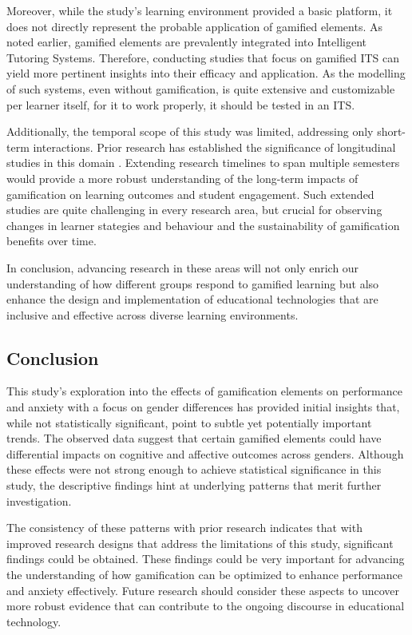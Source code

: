 Moreover, while the study's learning environment provided a basic platform, it does not directly represent the probable application of gamified elements. As noted earlier, gamified elements are prevalently integrated into Intelligent Tutoring Systems. Therefore, conducting studies that focus on gamified ITS can yield more pertinent insights into their efficacy and application.
As the modelling of such systems, even without gamification, is quite extensive and customizable per learner itself, for it to work properly, it should be tested in an ITS.

Additionally, the temporal scope of this study was limited, addressing only short-term interactions. Prior research has established the significance of longitudinal studies in this domain \parencite{oliveiraTailoredGamificationEducation2023,dehghanzadehUsingGamificationSupport2024}. Extending research timelines to span multiple semesters would provide a more robust understanding of the long-term impacts of gamification on learning outcomes and student engagement. Such extended studies are quite challenging in every research area, but crucial for observing changes in learner stategies and behaviour and the sustainability of gamification benefits over time.

In conclusion, advancing research in these areas will not only enrich our understanding of how different groups respond to gamified learning but also enhance the design and implementation of educational technologies that are inclusive and effective across diverse learning environments.

\subsection*{Conclusion}
This study's exploration into the effects of gamification elements on performance and anxiety with a focus on gender differences has provided initial insights that, while not statistically significant, point to subtle yet potentially important trends.
The observed data suggest that certain gamified elements could have differential impacts on cognitive and affective outcomes across genders.
Although these effects were not strong enough to achieve statistical significance in this study, the descriptive findings hint at underlying patterns that merit further investigation.

The consistency of these patterns with prior research indicates that with improved research designs that address the limitations of this study, significant findings could be obtained.
These findings could be very important for advancing the understanding of how gamification can be optimized to enhance performance and anxiety effectively.
Future research should consider these aspects to uncover more robust evidence that can contribute to the ongoing discourse in educational technology.
